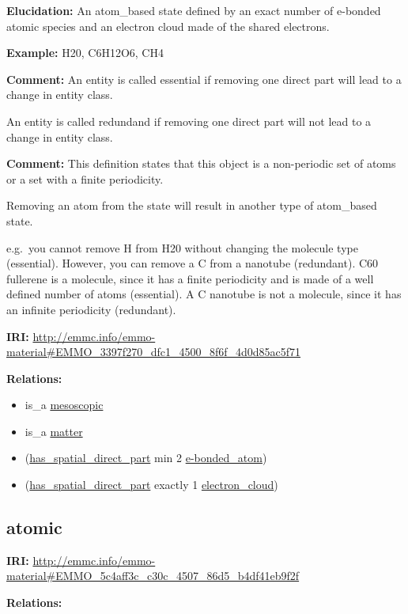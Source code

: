 \documentclass[a4paper,]{report}
\providecommand{\tightlist}{%
  \setlength{\itemsep}{0pt}\setlength{\parskip}{0pt}}
\begin{document}
\textbf{Elucidation:} An atom\_based state defined by an exact number of
e-bonded atomic species and an electron cloud made of the shared
electrons.

\textbf{Example:} H20, C6H12O6, CH4

\textbf{Comment:} An entity is called essential if removing one direct
part will lead to a change in entity class.

An entity is called redundand if removing one direct part will not lead
to a change in entity class.

\textbf{Comment:} This definition states that this object is a
non-periodic set of atoms or a set with a finite periodicity.

Removing an atom from the state will result in another type of
atom\_based state.

e.g.~you cannot remove H from H20 without changing the molecule type
(essential). However, you can remove a C from a nanotube (redundant).
C60 fullerene is a molecule, since it has a finite periodicity and is
made of a well defined number of atoms (essential). A C nanotube is not
a molecule, since it has an infinite periodicity (redundant).

\textbf{IRI:}
\url{http://emmc.info/emmo-material\#EMMO_3397f270_dfc1_4500_8f6f_4d0d85ac5f71}

\textbf{Relations:}

\begin{itemize}
\tightlist
\item
  is\_a \protect\hyperlink{mesoscopic}{mesoscopic}
\item
  is\_a \protect\hyperlink{matter}{matter}
\item
  (\protect\hyperlink{has_spatial_direct_part}{has\_spatial\_direct\_part}
  min 2 \protect\hyperlink{e-bonded_atom}{e-bonded\_atom})
\item
  (\protect\hyperlink{has_spatial_direct_part}{has\_spatial\_direct\_part}
  exactly 1 \protect\hyperlink{electron_cloud}{electron\_cloud})
\end{itemize}

\hypertarget{atomic}{%
\subsection{atomic}\label{atomic}}

\textbf{IRI:}
\url{http://emmc.info/emmo-material\#EMMO_5c4aff3c_c30c_4507_86d5_b4df41eb9f2f}

\textbf{Relations:}
\end{document}

